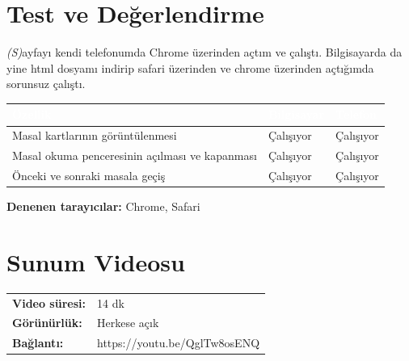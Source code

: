 \documentclass[12pt,a4paper]{article}
\newcommand{\aciklama}[1]{{\color{gray}\itshape (#1)}}
\begin{document}
\section{Test ve Değerlendirme}
\aciklama Sayfayı kendi telefonumda Chrome üzerinden açtım ve çalıştı. Bilgisayarda da yine html dosyamı indirip safari üzerinden ve chrome üzerinden açtığımda sorunsuz  çalıştı.

\begin{center}
\begin{tabular}{@{}p{6cm}p{3.4cm}p{3.4cm}@{}}
\toprule
\rowcolor{ana}\textcolor{white}{\textbf{Özellik}} & \textcolor{white}{\textbf{Bilgisayar}} & \textcolor{white}{\textbf{Telefon}} \\
\midrule
\relax Masal kartlarının görüntülenmesi & Çalışıyor & Çalışıyor \\
\relax Masal okuma penceresinin açılması ve kapanması & Çalışıyor & Çalışıyor \\
\relax Önceki ve sonraki masala geçiş & Çalışıyor & Çalışıyor \\
\bottomrule
\end{tabular}
\end{center}

\textbf{Denenen tarayıcılar:} Chrome, Safari 

\section{Sunum Videosu}
\begin{center}
\begin{tabular}{@{}ll@{}}
\textbf{Video süresi:} & 14 dk \quad \ \\
\textbf{Görünürlük:} & Herkese açık \\
\textbf{Bağlantı:} & https://youtu.be/QglTw8osENQ \\
\end{tabular}
\end{center}
\end{document}

